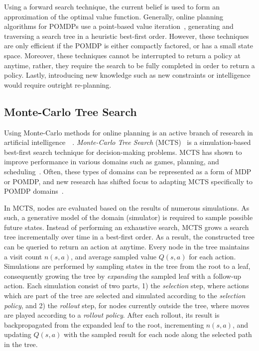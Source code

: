 \documentclass[conference]{IEEEtran}
\begin{document}
Using a forward search technique, the current belief is used to form an approximation of the optimal value function. Generally, online planning algorithms for POMDPs use a point-based value iteration~\cite{pineau2006anytime,ross2008online}, generating and traversing a search tree in a heuristic best-first order. However, these techniques are only efficient if the POMDP is either compactly factored, or has a small state space. Moreover, these techniques cannot be interrupted to return a policy at anytime, rather, they require the search to be fully completed in order to return a policy. Lastly, introducing new knowledge such as new constraints or intelligence would require outright re-planning.

\subsection{Monte-Carlo Tree Search}
\label{sub:mcts}

Using Monte-Carlo methods for online planning is an active branch of research in artificial intelligence~\cf~\cite{browne2012survey}. {\it Monte-Carlo Tree Search} (MCTS)~\cite{coulom2007efficient,kocsis2006bandit} is a simulation-based best-first search technique for decision-making problems. MCTS has shown to improve performance in various domains such as games, planning, and scheduling~\cite{browne2012survey}. Often, these types of domains can be represented as a form of MDP or POMDP, and new research has shifted focus to adapting MCTS specifically to POMDP domains~\cite{silver2010monte,Feldman12BRUE}. 

In MCTS, nodes are evaluated based on the results of numerous simulations. As such, a generative model of the domain (\ie simulator) is required to sample possible future states. Instead of performing an exhaustive search, MCTS grows a search tree incrementally over time in a best-first order. As a result, the constructed tree can be queried to return an action at anytime. Every node in the tree maintains a visit count $n(s,a)$, and average sampled value $Q(s,a)$ for each action. Simulations are performed by sampling states in the tree from the root to a leaf, consequently growing the tree by \emph{expanding} the sampled leaf with a follow-up action. Each simulation consist of two parts, 1) the \emph{selection} step, where actions which are part of the tree are selected and simulated according to the {\it selection policy}, and 2) the \emph{rollout} step, for nodes currently outside the tree, where moves are played according to a \emph{rollout policy}. After each rollout, its result is backpropagated from the expanded leaf to the root, incrementing $n(s,a)$, and updating $Q(s,a)$ with the sampled result for each node along the selected path in the tree.
\end{document}
